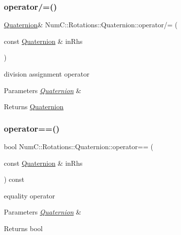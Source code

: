 \subsubsection{\texorpdfstring{operator/=()}{operator/=()}}
{\footnotesize\ttfamily \mbox{\hyperlink{class_num_c_1_1_rotations_1_1_quaternion}{Quaternion}}\& Num\+C\+::\+Rotations\+::\+Quaternion\+::operator/= (\begin{DoxyParamCaption}\item[{const \mbox{\hyperlink{class_num_c_1_1_rotations_1_1_quaternion}{Quaternion}} \&}]{in\+Rhs }\end{DoxyParamCaption})\hspace{0.3cm}{\ttfamily [inline]}}

division assignment operator


\begin{DoxyParams}{Parameters}
{\em \mbox{\hyperlink{class_num_c_1_1_rotations_1_1_quaternion}{Quaternion}}} & \\
\hline
\end{DoxyParams}
\begin{DoxyReturn}{Returns}
\mbox{\hyperlink{class_num_c_1_1_rotations_1_1_quaternion}{Quaternion}} 
\end{DoxyReturn}
\mbox{\label{class_num_c_1_1_rotations_1_1_quaternion_a5695d1bfb38cedffcc4e3f0769a1c9cd}} 
\subsubsection{\texorpdfstring{operator==()}{operator==()}}
{\footnotesize\ttfamily bool Num\+C\+::\+Rotations\+::\+Quaternion\+::operator== (\begin{DoxyParamCaption}\item[{const \mbox{\hyperlink{class_num_c_1_1_rotations_1_1_quaternion}{Quaternion}} \&}]{in\+Rhs }\end{DoxyParamCaption}) const\hspace{0.3cm}{\ttfamily [inline]}}

equality operator


\begin{DoxyParams}{Parameters}
{\em \mbox{\hyperlink{class_num_c_1_1_rotations_1_1_quaternion}{Quaternion}}} & \\
\hline
\end{DoxyParams}
\begin{DoxyReturn}{Returns}
bool 
\end{DoxyReturn}
\mbox{\label{class_num_c_1_1_rotations_1_1_quaternion_ac74bd4adb9f6c96b062a226d7f07420b}} 
